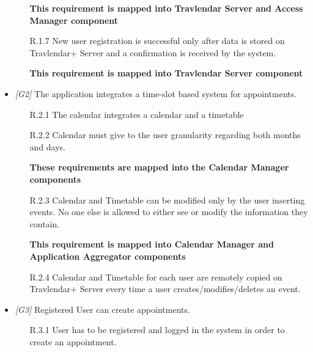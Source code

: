 \begin{itemize}
\begin{itemize}
			\textbf{This requirement is mapped into Travlendar Server and Access Manager component}

			\item [R.1.7] New user registration is successful only after data is stored on Travlendar+ Server and a confirmation is received by the system.

			\textbf{This requirement is mapped into Travlendar Server component}
			

		\end{itemize}


	\item \textit{[G2]} The application integrates a time-slot based system for appointments.

		\begin{itemize}

			\item [R.2.1] The calendar integrates a calendar and a timetable

			\item [R.2.2] Calendar must give to the user granularity regarding both months and days.
			
			\textbf{These requirements are mapped into the Calendar Manager components}

			\item [R.2.3] Calendar and Timetable can be modified only by the user inserting events. No one else is allowed to either see or modify the information they contain.
			
			\textbf{This requirement is mapped into Calendar Manager and Application Aggregator components}
			

			\item [R.2.4] Calendar and Timetable for each user are remotely copied on Travlendar+ Server every time a user creates/modifies/deletes an event.
			
			

		\end{itemize}

                  

	

	\item \textit{[G3]} Registered User can create appointments.

		\begin{itemize}

			\item [R.3.1] User has to be registered and logged in the system in order to create an appointment.
			

\end{itemize}
\end{itemize}
